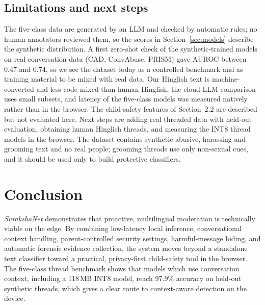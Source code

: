 \documentclass[sigconf,9pt]{acmart}
\begin{document}
\subsection*{Limitations and next steps}
The five-class data are generated by an LLM and checked by automatic rules; no human annotators reviewed them, so the scores in Section~\ref{sec:models} describe the synthetic distribution. A first zero-shot check of the synthetic-trained models on real conversation data (CAD, ConvAbuse, PRISM) gave AUROC between 0.47 and 0.74, so we see the dataset today as a controlled benchmark and as training material to be mixed with real data. Our Hinglish text is machine-converted and less code-mixed than human Hinglish, the cloud-LLM comparison uses small subsets, and latency of the five-class models was measured natively rather than in the browser. The child-safety features of Section~2.2 are described but not evaluated here. Next steps are adding real threaded data with held-out evaluation, obtaining human Hinglish threads, and measuring the INT8 thread models in the browser. The dataset contains synthetic abusive, harassing and grooming text and no real people; grooming threads use only non-sexual cues, and it should be used only to build protective classifiers.

\section{Conclusion}
\textit{SurakshaNet} demonstrates that proactive, multilingual moderation is technically viable on the edge. By combining low-latency local inference, conversational context handling, parent-controlled security settings, harmful-message hiding, and automatic forensic evidence collection, the system moves beyond a standalone text classifier toward a practical, privacy-first child-safety tool in the browser. The five-class thread benchmark shows that models which use conversation context, including a 118\,MB INT8 model, reach 97.9\% accuracy on held-out synthetic threads, which gives a clear route to context-aware detection on the device.



\end{document}

